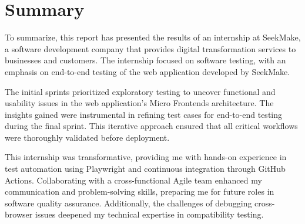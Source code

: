 \chapter*{Summary}

To summarize, this report has presented the results of an internship at SeekMake, a software development company that provides digital transformation services to businesses and customers. The internship focused on software testing, with an emphasis on end-to-end testing of the web application developed by SeekMake.

The initial sprints prioritized exploratory testing to uncover functional and usability issues in the web application’s Micro Frontends architecture. The insights gained were instrumental in refining test cases for end-to-end testing during the final sprint. This iterative approach ensured that all critical workflows were thoroughly validated before deployment.

This internship was transformative, providing me with hands-on experience in test automation using Playwright and continuous integration through GitHub Actions. Collaborating with a cross-functional Agile team enhanced my communication and problem-solving skills, preparing me for future roles in software quality assurance. Additionally, the challenges of debugging cross-browser issues deepened my technical expertise in compatibility testing.